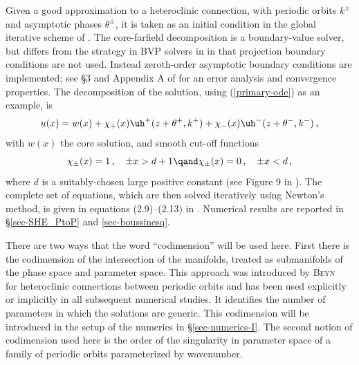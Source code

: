 \documentclass[10pt]{article}
\begin{document}
Given a good approximation to a heteroclinic connection, with periodic
orbits $k^\pm$ and asymptotic phases $\theta^{\pm}$, it is taken as an initial
condition in the global iterative scheme of \cite{Lloyd2017}. The core-farfield
decomposition is a boundary-value solver, but differs from the strategy in BVP
solvers in \cite{beyn94,p01,p09,dr04,dkvk09} in that projection boundary
conditions are not used.  Instead zeroth-order asymptotic boundary conditions
are implemented; see \S3 and Appendix A of \cite{Lloyd2017} for an error analysis and
convergence properties. The decomposition of the solution, using
(\ref{primary-ode}) as an example, is
\[
u(x) = w(x) + \chi_+(x)\uh^+(z+\theta^+,k^+) + \chi_-(x)\uh^-(z+\theta^-,k^-)\,,
\]
with $w(x)$ the core solution, and smooth cut-off functions
\[
\chi_{\pm}(x) =1\,,\quad \pm x>d+1\qand \chi_{\pm}(x)=0\,,\quad \pm x < d\,,
\]
where $d$ is a suitably-chosen large positive constant (see Figure 9 in
\cite{Lloyd2017}).  The complete set of equations, which are then solved iteratively
using Newton's method, is given in equations (2.9)--(2.13) in \cite{Lloyd2017}.
Numerical results are reported in \S \ref{sec-SHE_PtoP} and \ref{sec-boussinesq}. 

There are two ways that the word ``codimension'' will be used here. First
there is the codimension of the intersection of the manifolds, treated as
submanifolds of the phase space and parameter space. This approach was
introduced by \textsc{Beyn}~\cite{beyn94} for heteroclinic connections between
periodic orbits and has been used explicitly or implicitly in all subsequent
numerical studies. It identifies the number of parameters in which the solutions
are generic.  This codimension will be introduced in the setup of the numerics
in \S\ref{sec-numerics-I}. The second notion of codimension used here is the order of the singularity in parameter space of a family of periodic orbits parameterized by
wavenumber.
\end{document}
